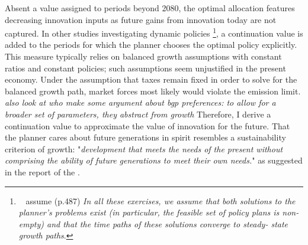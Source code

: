 Absent a value assigned to periods beyond 2080, the optimal allocation features decreasing innovation inputs as future gains from innovation today are not captured. In other studies investigating dynamic policies \citep{Jones1993OptimalGrowth, Barrage2019OptimalPolicy}\footnote{\ \cite{Jones1993OptimalGrowth} assume (p.487) \textit{ In all these exercises, we assume that both solutions to the planner's problems exist (in particular, the feasible set of policy plans is non- empty) and that the time paths of these solutions converge to steady- state growth paths}.}, a continuation value is added to the periods for which the planner chooses the optimal policy explicitly. This measure typically relies on balanced growth assumptions with constant ratios and constant policies; such assumptions seem unjustified  in the present economy.
Under the assumption that taxes remain fixed in order to solve for the balanced growth path, market forces most likely would violate the emission limit. \textit{ also look at \cite{Conesa2009TaxingAll} who make some argument about bgp preferences: to allow for a broader set of parameters, they abstract from growth}
Therefore, I derive a continuation value to approximate the value of innovation for the future.
 That the planner cares about future generations in spirit resembles a sustainability criterion of growth: "\textit{development that meets the needs of the present without comprising the ability of future generations to meet their own needs.}" as suggested in the report of the \cite{UNSUS}.

 

  


